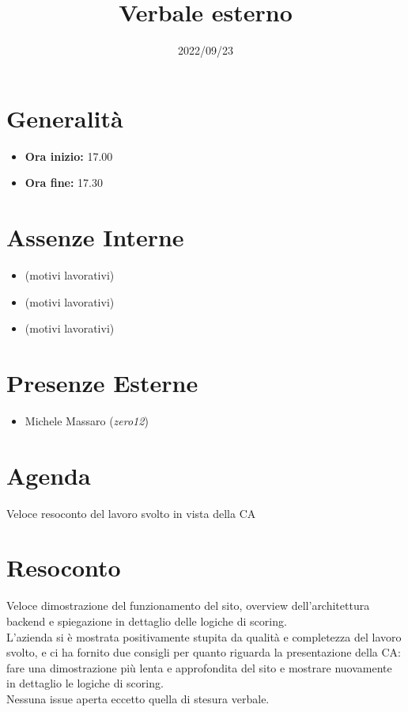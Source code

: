 \documentclass{classes/base}
\title{Verbale esterno}
\date{2022/09/23}
\author{\marcob}
\renewcommand{\maketitle}{
    
}
\begin{document}
    \maketitle

    \section*{Generalità}
    \begin{itemize}
        \item \textbf{Ora inizio:} 17.00
        \item \textbf{Ora fine:} 17.30
    \end{itemize}

    \section*{Assenze Interne}
    \begin{itemize}
    	\item \angela (motivi lavorativi)
        \item \matteo (motivi lavorativi)
        \item \ruth (motivi lavorativi)
    \end{itemize}
    \section*{Presenze Esterne}
    \begin{itemize}
    	\item Michele Massaro (\textit{zero12})
    \end{itemize}

    \section*{Agenda}
    Veloce resoconto del lavoro svolto in vista della CA

    \section*{Resoconto}
    Veloce dimostrazione del funzionamento del sito, overview dell'architettura backend e spiegazione
    in dettaglio delle logiche di scoring.\\
    L'azienda si è mostrata positivamente stupita da qualità e completezza del lavoro svolto, e ci ha
    fornito due consigli per quanto riguarda la presentazione della CA: fare una dimostrazione più
    lenta e approfondita del sito e mostrare nuovamente in dettaglio le logiche di scoring.\\
    Nessuna issue aperta eccetto quella di stesura verbale. 
\end{document}
